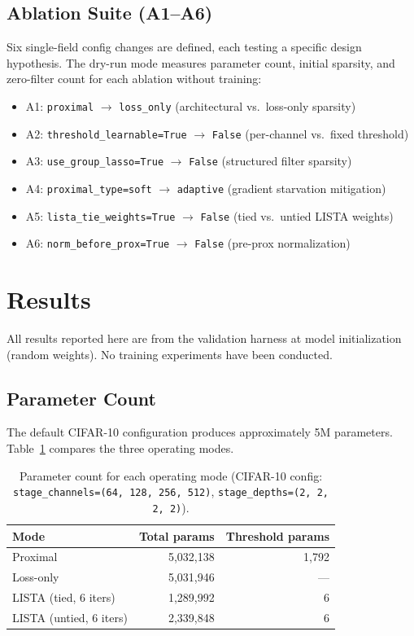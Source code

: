 \documentclass{article}
\begin{document}
\subsection{Ablation Suite (A1--A6)}

Six single-field config changes are defined, each testing a specific design
hypothesis. The dry-run mode measures parameter count, initial sparsity, and
zero-filter count for each ablation without training:
\begin{itemize}
    \item A1: \texttt{proximal} $\to$ \texttt{loss\_only} (architectural vs.\
          loss-only sparsity)
    \item A2: \texttt{threshold\_learnable=True} $\to$ \texttt{False} (per-channel
          vs.\ fixed threshold)
    \item A3: \texttt{use\_group\_lasso=True} $\to$ \texttt{False} (structured
          filter sparsity)
    \item A4: \texttt{proximal\_type=soft} $\to$ \texttt{adaptive} (gradient
          starvation mitigation)
    \item A5: \texttt{lista\_tie\_weights=True} $\to$ \texttt{False} (tied vs.\
          untied LISTA weights)
    \item A6: \texttt{norm\_before\_prox=True} $\to$ \texttt{False} (pre-prox
          normalization)
\end{itemize}

\section{Results}
\label{sec:results}

All results reported here are from the validation harness at model
initialization (random weights). No training experiments have been conducted.

\subsection{Parameter Count}

The default CIFAR-10 configuration produces approximately 5M parameters.
Table~\ref{tab:params} compares the three operating modes.

\begin{table}[h]
\centering
\caption{Parameter count for each operating mode (CIFAR-10 config:
         \texttt{stage\_channels=(64, 128, 256, 512)},
         \texttt{stage\_depths=(2, 2, 2, 2)}).}\label{tab:params}
\begin{tabular}{lrr}
\toprule
Mode & Total params & Threshold params \\
\midrule
Proximal    & 5,032,138 & 1,792 \\
Loss-only   & 5,031,946 & ---   \\
LISTA (tied, 6 iters) & 1,289,992 & 6 \\
LISTA (untied, 6 iters) & 2,339,848 & 6 \\
\bottomrule
\end{tabular}
\end{table}
\end{document}

